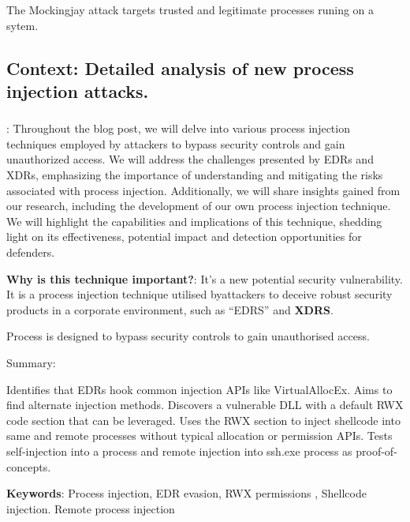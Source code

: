 \documentclass{article}
\begin{document}
The Mockingjay  attack targets trusted and legitimate processes runing on a sytem.  


\subsection{Context: Detailed analysis of new process injection attacks.}

 \autocite{smellyvx:2021}
\subsubsection{\textcite{Peixoto:2023}}
\textbf{}: Throughout the blog post, we will delve into various process injection techniques employed by attackers to bypass security controls and gain unauthorized access. We will address the challenges presented by EDRs and XDRs, emphasizing the importance of understanding and mitigating the risks associated with process injection. Additionally, we will share insights gained from our research, including the development of our own process injection technique. We will highlight the capabilities and implications of this technique, shedding light on its effectiveness, potential impact and detection opportunities for defenders.

\textbf{Why is this technique important?}: It's a new potential security vulnerability. It is a process injection
technique utilised byattackers to deceive robust security products in a corporate environment, such as ``EDRS'' and \textbf{XDRS}.

Process is designed to bypass security controls to gain unauthorised access.


Summary:

Identifies that EDRs hook common injection APIs like VirtualAllocEx. Aims to find alternate injection methods.
Discovers a vulnerable DLL with a default RWX code section that can be leveraged.
Uses the RWX section to inject shellcode into same and remote processes without typical allocation or permission APIs.
Tests self-injection into a process and remote injection into ssh.exe process as proof-of-concepts.

\textbf{Keywords}: Process injection, EDR evasion, RWX permissions , Shellcode injection. Remote process injection
\end{document}
